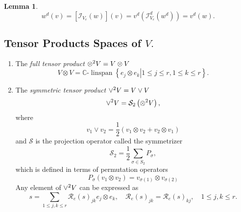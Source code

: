 \documentclass[aps,preprint]{revtex4}%
\newtheorem{lemma}[theorem]{Lemma}
\begin{document}
\begin{lemma}%
\begin{equation}
\ w^{d}\left(  v\right)  =\left[  \mathcal{I}_{V_{e}}\left(  w\right)
\right]  \left(  v\right)  =v^{d}\left(  \mathcal{I}_{V_{e}}^{d}\left(
w^{d}\right)  \right)  =v^{d}\left(  w\right)  .
\end{equation}

\end{lemma}

\subsection{Tensor Products Spaces of $V.$}

\begin{enumerate}
\item The \emph{full tensor product} ${\Large \otimes}^{2}V=V\otimes V$%
\begin{equation}
V\otimes V=\mathbb{C}\text{-}\operatorname*{linspan}\left\{  \left.
e_{j}\otimes e_{k}\right\vert 1\leq j\leq r,1\leq k\leq r\right\}  .
\end{equation}


\item The \emph{symmetric tensor product} ${\huge \vee}^{2}V=V\vee V$%
\begin{equation}
{\huge \vee}^{2}V=\mathcal{S}_{2}\left(  {\Large \otimes}^{2}V\right)  ,
\end{equation}
where
\begin{equation}
v_{1}\vee v_{2}=\frac{1}{2}\left(  v_{1}\otimes v_{2}+v_{2}\otimes
v_{1}\right)
\end{equation}
and $\mathcal{S}$ is the projection operator called the symmetrizer
\begin{equation}
\mathcal{S}_{2}=\frac{1}{2}\sum_{\sigma\in S_{2}}P_{\sigma},
\end{equation}
which is defined in terms of permutation operators
\begin{equation}
P_{\sigma}\left(  v_{1}\otimes v_{2}\right)  =v_{\sigma\left(  1\right)
}\otimes v_{\sigma\left(  2\right)  }%
\end{equation}
Any element of ${\huge \vee}^{2}V$ can be expressed as
\begin{equation}
s=\sum_{1\leq j,k\leq r}\mathcal{R}_{e}\left(  s\right)  _{jk}e_{j}\otimes
e_{k},\quad\mathcal{R}_{e}\left(  s\right)  _{jk}=\mathcal{R}_{e}\left(
s\right)  _{kj},\quad1\leq j,k\leq r.
\end{equation}



\end{enumerate}
\end{document}
